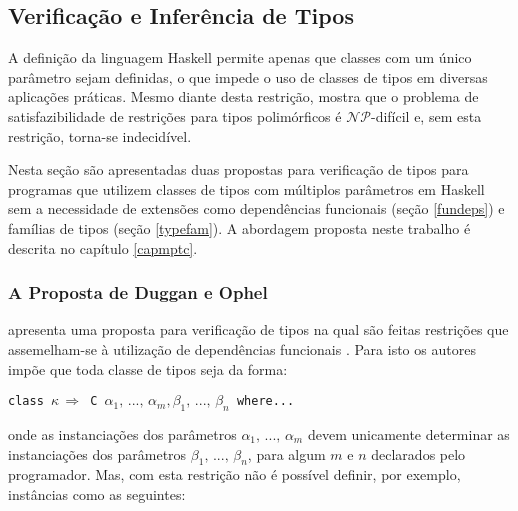 \subsection{Verifica\c{c}\~ao e Infer\^encia de Tipos}

A defini\c{c}\~ao da linguagem Haskell permite apenas que 
classes com um \'unico par\^ametro \cite{Duggan02a, Haskell98} sejam definidas, o que impede o uso de classes de tipos
em diversas aplica\c{c}\~oes pr\'aticas. Mesmo diante desta restri\c{c}\~ao, \cite{Volpano94}
mostra que o problema de satisfazibilidade de restri\c{c}\~oes para tipos polim\'orficos \'e $\mathcal{NP}$-dif\'icil
e, sem esta restri\c{c}\~ao, torna-se indecid\'ivel.

Nesta se\c{c}\~ao s\~ao apresentadas duas propostas para verifica\c{c}\~ao de tipos para programas que utilizem 
classes de tipos com m\'ultiplos par\^ametros em Haskell sem a necessidade de extens\~oes como 
depend\^encias funcionais (se\c{c}\~ao \ref{fundeps}) e fam\'ilias de tipos (se\c{c}\~ao \ref{typefam}). A abordagem
proposta neste trabalho \'e descrita no cap\'itulo \ref{capmptc}.

\subsubsection{A Proposta de Duggan e Ophel}


\cite{Duggan02a} apresenta uma proposta para verifica\c{c}\~ao de tipos na qual s\~ao feitas restri\c{c}\~oes 
que assemelham-se \`a utiliza\c{c}\~ao de depend\^encias funcionais \cite{Jones00}. Para isto os autores imp\~oe que 
toda classe de tipos seja da forma: 
\begin{center}
\texttt{class $\kappa\,\Rightarrow$ C $\alpha_{1},\,...,\,\alpha_{m},\beta_{1},\,...,\,\beta_{n}$ where...}
\end{center}
onde as instancia\c{c}\~oes dos par\^ametros $\alpha_{1},\,...,\,\alpha_{m}$ devem unicamente determinar as 
instancia\c{c}\~oes dos par\^ametros $\beta_{1},\,...,\,\beta_{n}$, para algum $m$ e $n$ declarados pelo programador.
Mas, com esta restri\c{c}\~ao n\~ao \'e poss\'ivel definir, por exemplo, inst\^ancias como as seguintes:

